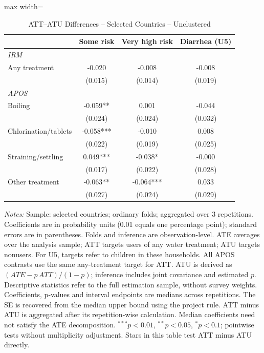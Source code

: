 \documentclass[10pt]{article}
\begin{document}
\clearpage
\begin{table}[H]
\centering
\caption{ATT--ATU Differences -- Selected Countries -- Unclustered}
\label{tab:ate-att-atu-selected-countries-iid-aggregated-difference}
\scriptsize
\setlength{\tabcolsep}{4pt}
\renewcommand{\arraystretch}{0.92}
\begin{adjustbox}{max width=\linewidth}
\begin{tabular}{lccc}
\hline\hline
 & Some risk & Very high risk & Diarrhea (U5) \\
\midrule
\multicolumn{4}{l}{\textit{IRM}} \\
Any treatment & -0.020 & -0.008 & -0.008 \\
 & (0.015) & (0.014) & (0.019) \\
\midrule
\multicolumn{4}{l}{\textit{APOS}} \\
Boiling & -0.059** & 0.001 & -0.044 \\
 & (0.024) & (0.024) & (0.032) \\
Chlorination/tablets & -0.058*** & -0.010 & 0.008 \\
 & (0.022) & (0.019) & (0.025) \\
Straining/settling & 0.049*** & -0.038* & -0.000 \\
 & (0.017) & (0.022) & (0.028) \\
Other treatment & -0.063** & -0.064*** & 0.033 \\
 & (0.027) & (0.024) & (0.029) \\
\hline\hline
\end{tabular}
\end{adjustbox}
\par\vspace{3pt}
\begin{minipage}{\linewidth}\scriptsize \textit{Notes:} Sample: selected countries; ordinary folds; aggregated over 3 repetitions. Coefficients are in probability units (0.01 equals one percentage point); standard errors are in parentheses. Folds and inference are observation-level. ATE averages over the analysis sample; ATT targets users of any water treatment; ATU targets nonusers. For U5, targets refer to children in these households. All APOS contrasts use the same any-treatment target for ATT. ATU is derived as $(ATE-p\,ATT)/(1-p)$; inference includes joint covariance and estimated $p$. Descriptive statistics refer to the full estimation sample, without survey weights. Coefficients, p-values and interval endpoints are medians across repetitions. The SE is recovered from the median upper bound using the project rule. ATT minus ATU is aggregated after its repetition-wise calculation. Median coefficients need not satisfy the ATE decomposition. $^{***}p<0.01$, $^{**}p<0.05$, $^{*}p<0.1$; pointwise tests without multiplicity adjustment. Stars in this table test ATT minus ATU directly.\end{minipage}
\end{table}
\end{document}
